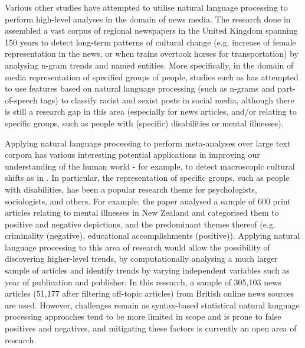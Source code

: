 \documentclass{report}
\begin{document}
Various other studies have attempted to utilise natural language processing to perform high-level analyses in the domain of news media.
The research done in \cite{lansdall2017content} assembled a vast corpus of regional newspapers in the United Kingdom spanning 150 years to detect long-term patterns of cultural change (e.g. increase of female representation in the news, or when trains overtook horses for transportation) by analysing n-gram trends and named entities. 
More specifically, in the domain of media representation of specified groups of people, studies such as \cite{waseem2016you} has attempted to use features based on natural language processing (such as n-grams and part-of-speech tags) to classify racist and sexist posts in social media, although there is still a research gap in this area (especially for news articles, and/or relating to specific groups, such as people with (specific) disabilities or mental illnesses).

Applying natural language processing to perform meta-analyses over large text corpora has various interesting potential applications in improving our understanding of the human world - for example, to detect macroscopic cultural shifts as in \cite{lansdall2017content}.
In particular, the representation of specific groups, such as people with disabilities, has been a popular research theme for psychologists, sociologists, and others.
For example, the paper \cite{coverdale2002depictions} analysed a sample of 600 print articles relating to mental illnesses in New Zealand and categorised them to positive and negative depictions, and the predominant themes thereof (e.g. criminality (negative), educational accomplishments (positive)).
Applying natural language processing to this area of research would allow the possibility of discovering higher-level trends, by computationally analysing a much larger sample of articles and identify trends by varying independent variables such as year of publication and publisher.
In this research, a sample of 305,103 news articles (51,177 after filtering off-topic articles) from British online news sources are used.
However, challenges remain as syntax-based statistical natural language processing approaches tend to be more limited in scope and is prone to false positives and negatives, and mitigating these factors is currently an open area of research.
\end{document}
